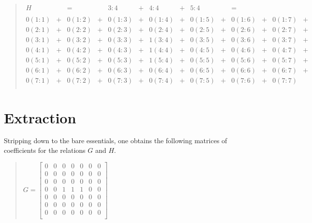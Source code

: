\documentclass[12pt]{article}
\begin{document}
\begin{quote}$\begin{array}{cccccccccccccccc}
H & & = & & 3:4 & + & 4:4 & + & 5:4 & & = \\
\\
0(1\mathrm{:}1) & + & 0(1\mathrm{:}2) & + & 0(1\mathrm{:}3) & + & 0(1\mathrm{:}4) & + & 0(1\mathrm{:}5) & + & 0(1\mathrm{:}6) & + & 0(1\mathrm{:}7) & + \\
0(2\mathrm{:}1) & + & 0(2\mathrm{:}2) & + & 0(2\mathrm{:}3) & + & 0(2\mathrm{:}4) & + & 0(2\mathrm{:}5) & + & 0(2\mathrm{:}6) & + & 0(2\mathrm{:}7) & + \\
0(3\mathrm{:}1) & + & 0(3\mathrm{:}2) & + & 0(3\mathrm{:}3) & + & 1(3\mathrm{:}4) & + & 0(3\mathrm{:}5) & + & 0(3\mathrm{:}6) & + & 0(3\mathrm{:}7) & + \\
0(4\mathrm{:}1) & + & 0(4\mathrm{:}2) & + & 0(4\mathrm{:}3) & + & 1(4\mathrm{:}4) & + & 0(4\mathrm{:}5) & + & 0(4\mathrm{:}6) & + & 0(4\mathrm{:}7) & + \\
0(5\mathrm{:}1) & + & 0(5\mathrm{:}2) & + & 0(5\mathrm{:}3) & + & 1(5\mathrm{:}4) & + & 0(5\mathrm{:}5) & + & 0(5\mathrm{:}6) & + & 0(5\mathrm{:}7) & + \\
0(6\mathrm{:}1) & + & 0(6\mathrm{:}2) & + & 0(6\mathrm{:}3) & + & 0(6\mathrm{:}4) & + & 0(6\mathrm{:}5) & + & 0(6\mathrm{:}6) & + & 0(6\mathrm{:}7) & + \\
0(7\mathrm{:}1) & + & 0(7\mathrm{:}2) & + & 0(7\mathrm{:}3) & + & 0(7\mathrm{:}4) & + & 0(7\mathrm{:}5) & + & 0(7\mathrm{:}6) & + & 0(7\mathrm{:}7) &   \\
\end{array}$\end{quote}

\section{Extraction}

Stripping down to the bare essentials, one obtains the following matrices of coefficients for the relations $G$ and $H$.

\begin{quote}$G =
\left[\begin{array}{ccccccc}
0 & 0 & 0 & 0 & 0 & 0 & 0 \\
0 & 0 & 0 & 0 & 0 & 0 & 0 \\
0 & 0 & 0 & 0 & 0 & 0 & 0 \\
0 & 0 & 1 & 1 & 1 & 0 & 0 \\
0 & 0 & 0 & 0 & 0 & 0 & 0 \\
0 & 0 & 0 & 0 & 0 & 0 & 0 \\
0 & 0 & 0 & 0 & 0 & 0 & 0 \\
\end{array}\right]$\end{quote}
\end{document}
